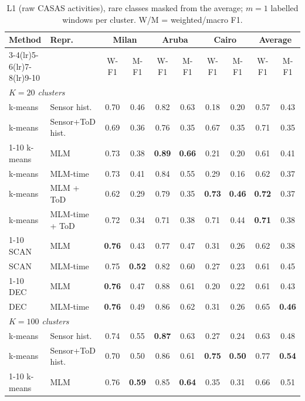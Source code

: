 \begin{table}[t]
\centering\small
\caption{L1 (raw CASAS activities), rare classes masked from the average; $m=1$ labelled windows per cluster. W/M = weighted/macro F1.}
\label{tab:l1_masked_m1}
\setlength{\tabcolsep}{4pt}
\begin{tabular}{llcccccc|cc}
\toprule
Method & Repr. & \multicolumn{2}{c}{Milan} & \multicolumn{2}{c}{Aruba} & \multicolumn{2}{c}{Cairo} & \multicolumn{2}{c}{Average} \\
\cmidrule(lr){3-4}\cmidrule(lr){5-6}\cmidrule(lr){7-8}\cmidrule(lr){9-10}
 & & W-F1 & M-F1 & W-F1 & M-F1 & W-F1 & M-F1 & W-F1 & M-F1 \\
\midrule
\multicolumn{10}{l}{\textit{$K = 20$ clusters}} \\
\midrule
k-means & Sensor hist. & 0.70 & 0.46 & 0.82 & 0.63 & 0.18 & 0.20 & 0.57 & 0.43 \\
k-means & Sensor+ToD hist. & 0.69 & 0.36 & 0.76 & 0.35 & 0.67 & 0.35 & 0.71 & 0.35 \\
\cmidrule{1-10}
k-means & MLM & 0.73 & 0.38 & \textbf{0.89} & \textbf{0.66} & 0.21 & 0.20 & 0.61 & 0.41 \\
k-means & MLM-time & 0.73 & 0.41 & 0.84 & 0.55 & 0.29 & 0.16 & 0.62 & 0.37 \\
k-means & MLM + ToD & 0.62 & 0.29 & 0.79 & 0.35 & \textbf{0.73} & \textbf{0.46} & \textbf{0.72} & 0.37 \\
k-means & MLM-time + ToD & 0.72 & 0.34 & 0.71 & 0.38 & 0.71 & 0.44 & \textbf{0.71} & 0.38 \\
\cmidrule{1-10}
SCAN & MLM & \textbf{0.76} & 0.43 & 0.77 & 0.47 & 0.31 & 0.26 & 0.62 & 0.38 \\
SCAN & MLM-time & 0.75 & \textbf{0.52} & 0.82 & 0.60 & 0.27 & 0.23 & 0.61 & 0.45 \\
\cmidrule{1-10}
DEC & MLM & \textbf{0.76} & 0.47 & 0.88 & 0.61 & 0.20 & 0.22 & 0.61 & 0.43 \\
DEC & MLM-time & \textbf{0.76} & 0.49 & 0.86 & 0.62 & 0.31 & 0.26 & 0.65 & \textbf{0.46} \\
\midrule
\multicolumn{10}{l}{\textit{$K = 100$ clusters}} \\
\midrule
k-means & Sensor hist. & 0.74 & 0.55 & \textbf{0.87} & 0.63 & 0.27 & 0.24 & 0.63 & 0.48 \\
k-means & Sensor+ToD hist. & 0.70 & 0.50 & 0.86 & 0.61 & \textbf{0.75} & \textbf{0.50} & 0.77 & \textbf{0.54} \\
\cmidrule{1-10}
k-means & MLM & 0.76 & \textbf{0.59} & 0.85 & \textbf{0.64} & 0.35 & 0.31 & 0.66 & 0.51 \\

\end{tabular}
\end{table}
